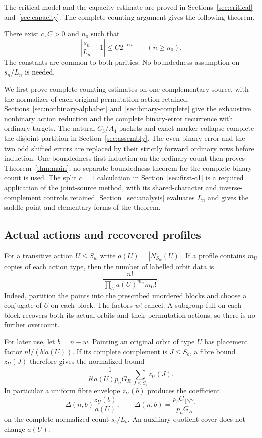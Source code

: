 The critical model and the capacity estimate are proved in
Sections~\ref{sec:critical} and~\ref{sec:capacity}. The complete counting
argument gives the following theorem.

\begin{theorem}\label{thm:main}
There exist $c,C>0$ and $n_0$ such that
\[
 \left|\frac{s_n}{L_n}-1\right|\leq C2^{-cn}\qquad(n\geq n_0).
\]
The constants are common to both parities. No boundedness assumption
on $s_n/L_n$ is needed.
\end{theorem}

We first prove complete counting estimates on one complementary source,
with the normalizer of each original permutation action retained.
Sections~\ref{sec:nonbinary-alphabet} and~\ref{sec:binary-complete}
give the exhaustive nonbinary action reduction and the complete binary-error
recurrence with ordinary targets. The natural $C_3/A_4$ packets and exact
marker collapse complete the disjoint partition in
Section~\ref{sec:assembly}. The even binary error and the two odd shifted
errors are replaced by their strictly forward ordinary rows before induction.
One boundedness-first induction on the ordinary count then proves
Theorem~\ref{thm:main}; no separate boundedness theorem for the complete
binary count is used.
The split $c=1$ calculation in Section~\ref{sec:first-c1} is a required
application of the joint-source method, with its shared-character and
inverse-complement controls retained. Section~\ref{sec:analysis} evaluates
$L_n$ and gives the saddle-point and elementary forms of the theorem.

\subsection{Actual actions and recovered profiles}
For a transitive action $U\leq S_w$ write
$a(U)=|N_{S_w}(U)|$. If a profile contains $m_U$ copies of each action
type, then the number of labelled orbit data is
\begin{equation}\label{eq:weights}
 \frac{n!}{\prod_U a(U)^{m_U}m_U!}.
\end{equation}
Indeed, partition the points into the prescribed unordered blocks and
choose a conjugate of $U$ on each block. The factors $w!$ cancel.
A subgroup full on each block recovers both its actual orbits and their
permutation actions, so there is no further overcount.

For later use, let $b=n-w$. Pointing an original orbit of type $U$
has placement factor $n!/(b!a(U))$. If its complete complement is
$J\leq S_b$, a fibre bound $z_U(J)$ therefore gives the normalized
bound
\begin{equation}\label{eq:pointing}
 \frac{1}{b!a(U)p_nG_R}\sum_{J\leq S_b}z_U(J).
\end{equation}
In particular a uniform fibre envelope $z_U(b)$ produces the coefficient
\begin{equation}\label{eq:delta}
 \Delta(n,b)\frac{z_U(b)}{a(U)},\qquad
 \Delta(n,b)=\frac{p_bG_{\lfloor b/2\rfloor}}{p_nG_R}
\end{equation}
on the complete normalized count $s_b/L_b$.
An auxiliary quotient cover does not change $a(U)$.

